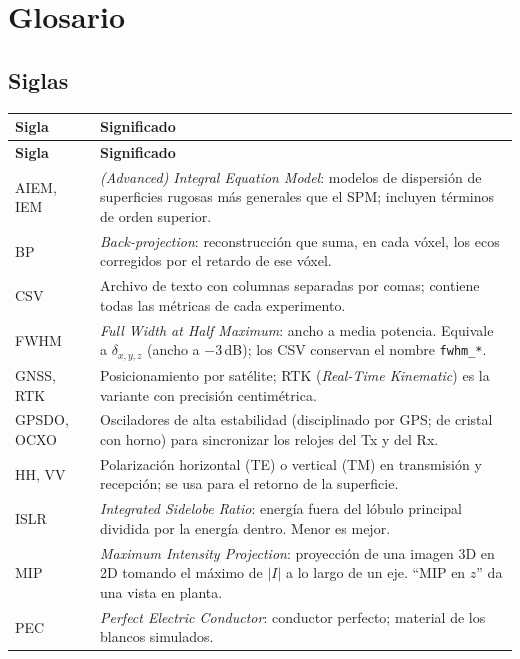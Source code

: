\chapter*{Glosario}
\label{cap:glosario}

\section*{Siglas}

\begin{longtable}{@{}L{2.4cm}L{12.0cm}@{}}
\toprule
\textbf{Sigla} & \textbf{Significado} \\
\midrule
\endfirsthead
\toprule
\textbf{Sigla} & \textbf{Significado} \\
\midrule
\endhead
AIEM, IEM & \emph{(Advanced) Integral Equation Model}: modelos de dispersión de superficies rugosas
            más generales que el SPM; incluyen términos de orden superior. \\
BP & \emph{Back-projection}: reconstrucción que suma, en cada vóxel, los ecos corregidos por el
     retardo de ese vóxel. \\
CSV & Archivo de texto con columnas separadas por comas; contiene todas las métricas de cada
      experimento. \\
FWHM & \emph{Full Width at Half Maximum}: ancho a media potencia. Equivale a $\delta_{x,y,z}$
       (ancho a $-3$\,dB); los CSV conservan el nombre \texttt{fwhm\_*}. \\
GNSS, RTK & Posicionamiento por satélite; RTK (\emph{Real-Time Kinematic}) es la variante con
            precisión centimétrica. \\
GPSDO, OCXO & Osciladores de alta estabilidad (disciplinado por GPS; de cristal con horno) para
              sincronizar los relojes del Tx y del Rx. \\
HH, VV & Polarización horizontal (TE) o vertical (TM) en transmisión y recepción; se usa para el
         retorno de la superficie. \\
ISLR & \emph{Integrated Sidelobe Ratio}: energía fuera del lóbulo principal dividida por la
       energía dentro. Menor es mejor. \\
MIP & \emph{Maximum Intensity Projection}: proyección de una imagen 3D en 2D tomando el máximo de
      $|I|$ a lo largo de un eje. ``MIP en $z$'' da una vista en planta. \\
PEC & \emph{Perfect Electric Conductor}: conductor perfecto; material de los blancos simulados. \\

\end{longtable}
